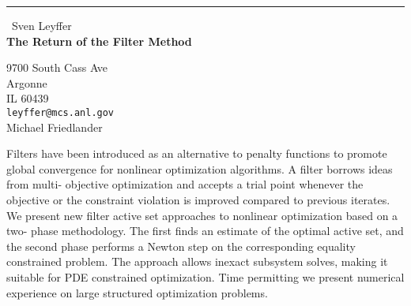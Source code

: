\documentclass{report}
\begin{document}
\begin{center}
\rule{6in}{1pt} \
{\large Sven Leyffer \\
{\bf The Return of the Filter Method }}

9700 South Cass Ave \\ Argonne \\ IL 60439
\\
{\tt leyffer@mcs.anl.gov}\\
Michael Friedlander\end{center}

Filters have been introduced as an alternative to penalty
functions to promote global convergence for nonlinear
optimization algorithms. A filter borrows ideas from multi-
objective optimization and accepts a trial point whenever
the objective or the constraint violation is improved
compared to previous iterates. We present new filter active
set approaches to nonlinear optimization based on a two-
phase methodology. The first finds an estimate of the optimal
active set, and the second phase performs a Newton step on
the corresponding equality constrained problem. The approach
allows inexact subsystem solves, making it suitable for PDE
constrained optimization. Time permitting we present numerical
experience on large structured optimization problems.
\end{document}
